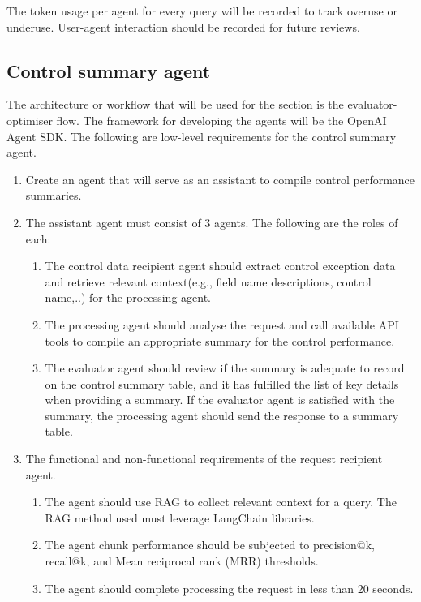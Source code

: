\documentclass{article}
\begin{document}
\begin{enumerate}
The token usage per agent for every query will be recorded to track overuse or underuse. User-agent interaction should be recorded for future reviews. 
\end{enumerate}

\subsection{Control summary agent}
The architecture or workflow that will be used for the section is the evaluator-optimiser flow. The framework for developing the agents will be the OpenAI Agent SDK. The following are low-level requirements for the control summary agent.

\begin{enumerate}
    \item Create an agent that will serve as an assistant to compile control performance summaries.
    \item The assistant agent must consist of 3 agents. The following are the roles of each:
    \begin{enumerate}
        \item The control data recipient agent should extract control exception data and retrieve relevant context(e.g., field name descriptions, control name,..) for the processing agent.
        \item The processing agent should analyse the request and call available API tools to compile an appropriate summary for the control performance.
        \item The evaluator agent should review if the summary is adequate to record on the control summary table, and it has fulfilled the list of key details when providing a summary. If the evaluator agent is satisfied with the summary, the processing agent should send the response to a summary table.
    \end{enumerate}
    \item The functional and non-functional requirements of the request recipient agent.
    \begin{enumerate}
        \item The agent should use RAG to collect relevant context for a query. The RAG method used must leverage LangChain libraries.
        \item The agent chunk performance should be subjected to precision@k, recall@k, and Mean reciprocal rank (MRR) thresholds.
        \item The agent should complete processing the request in less than 20 seconds.

\end{enumerate}
\end{enumerate}
\end{document}
